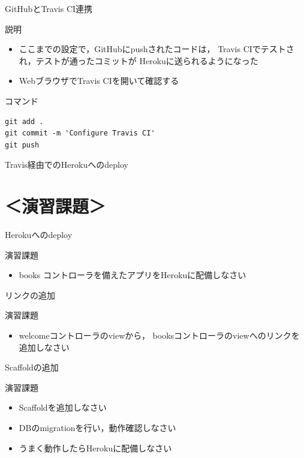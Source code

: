 \documentclass[t, aspectratio=169]{beamer}
\begin{document}
\begin{frame}[fragile,label=sec-7-3-7]{GitHubとTravis CI連携}
 \begin{block}{説明}
\begin{itemize}
\item ここまでの設定で，GitHubにpushされたコードは，
Travis CIでテストされ，テストが通ったコミットが
Herokuに送られるようになった
\item WebブラウザでTravis CIを開いて確認する
\end{itemize}
\end{block}

\begin{block}{コマンド}
\begin{verbatim}
git add .
git commit -m 'Configure Travis CI'
git push
\end{verbatim}
\end{block}
\end{frame}

\begin{frame}[label=sec-7-3-8]{Travis経由でのHerokuへのdeploy}
\end{frame}
\section{＜演習課題＞}
\label{sec-7-4}
\begin{frame}[label=sec-7-4-1]{Herokuへのdeploy}
\begin{block}{演習課題}
\begin{itemize}
\item books コントローラを備えたアプリをHerokuに配備しなさい
\end{itemize}
\end{block}
\end{frame}

\begin{frame}[label=sec-7-4-2]{リンクの追加}
\begin{block}{演習課題}
\begin{itemize}
\item welcomeコントローラのviewから，
booksコントローラのviewへのリンクを追加しなさい
\end{itemize}
\end{block}
\end{frame}

\begin{frame}[label=sec-7-4-3]{Scaffoldの追加}
\begin{block}{演習課題}
\begin{itemize}
\item Scaffoldを追加しなさい
\item DBのmigrationを行い，動作確認しなさい
\item うまく動作したらHerokuに配備しなさい
\end{itemize}
\end{block}
\end{frame}
\end{document}
